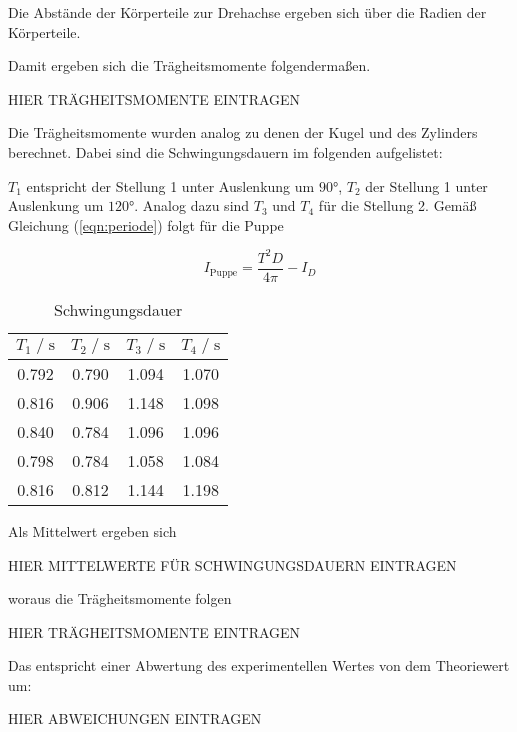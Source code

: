 
Die Abstände der Körperteile zur Drehachse ergeben sich über die Radien der Körperteile.

Damit ergeben sich die Trägheitsmomente folgendermaßen.
\begin{center}
  HIER TRÄGHEITSMOMENTE EINTRAGEN
\end{center}

Die Trägheitsmomente wurden analog zu denen der Kugel und des Zylinders berechnet. Dabei sind die Schwingungsdauern im folgenden
aufgelistet:

$T_1$ entspricht der Stellung 1 unter Auslenkung um $90°$, $T_2$ der Stellung 1 unter Auslenkung um $120°$.
Analog dazu sind $T_3$ und $T_4$ für die Stellung 2. Gemäß Gleichung (\autoref{eqn:periode}) folgt für die Puppe


\begin{equation}
  I_{\text{Puppe}} = \frac{T^2D}{4\pi} - I_D
\end{equation}

\begin{table}
    \centering
        \caption{Schwingungsdauer}
        \label{tab:schwingdauer}
        \begin{tabular}{c c c c}
        \toprule
        $T_1 \;/\; \si{\second}$ & $T_2 \;/\; \si{\second}$ & $T_3 \;/\; \si{\second}$ & $T_4 \;/\; \si{\second}$ \\
        \midrule
        0.792 & 0.790 & 1.094 & 1.070 \\
        0.816 & 0.906 & 1.148 & 1.098 \\
        0.840 & 0.784 & 1.096 & 1.096 \\
        0.798 & 0.784 & 1.058 & 1.084 \\
        0.816 & 0.812 & 1.144 & 1.198 \\
        \bottomrule
    \end{tabular}
\end{table}

Als Mittelwert ergeben sich
\begin{center}
  HIER MITTELWERTE FÜR SCHWINGUNGSDAUERN EINTRAGEN
\end{center}

woraus die Trägheitsmomente folgen %
\begin{center}
  HIER TRÄGHEITSMOMENTE EINTRAGEN
\end{center}

Das entspricht einer Abwertung des experimentellen Wertes von dem Theoriewert um:
\begin{center}
  HIER ABWEICHUNGEN EINTRAGEN
\end{center}

